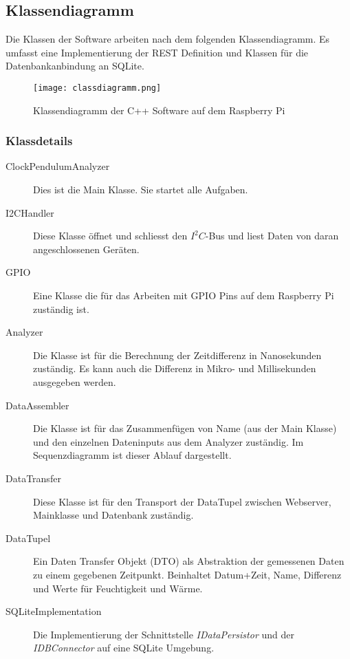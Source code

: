 \subsection{Klassendiagramm}
Die Klassen der Software arbeiten nach dem folgenden Klassendiagramm. Es umfasst eine Implementierung der REST Definition und Klassen für die Datenbankanbindung an SQLite.
\begin{figure}[H]
    \centering
    \texttt{[image: classdiagramm.png]}
    \caption{Klassendiagramm der C++ Software auf dem Raspberry Pi}
\end{figure}
\subsubsection{Klassdetails}
	\begin{description}
        \item[ClockPendulumAnalyzer] Dies ist die Main Klasse. Sie startet alle Aufgaben.
        \item[I2CHandler] Diese Klasse öffnet und schliesst den $I^2C$-Bus und liest Daten von daran angeschlossenen Geräten.
        \item[GPIO] Eine Klasse die für das Arbeiten mit GPIO Pins auf dem Raspberry Pi zuständig ist.
        \item[Analyzer] Die Klasse ist für die Berechnung der Zeitdifferenz in Nanosekunden zuständig. Es kann auch die Differenz in Mikro- und Millisekunden ausgegeben werden.
        \item[DataAssembler] Die Klasse ist für das Zusammenfügen von Name (aus der Main Klasse) und den einzelnen Dateninputs aus dem Analyzer zuständig. Im Sequenzdiagramm ist dieser Ablauf dargestellt. %
        \item[DataTransfer] Diese Klasse ist für den Transport der DataTupel zwischen Webserver, Mainklasse und Datenbank zuständig.
        \item[DataTupel] Ein Daten Transfer Objekt (DTO) als Abstraktion der gemessenen Daten zu einem gegebenen Zeitpunkt. Beinhaltet Datum+Zeit, Name, Differenz und Werte für Feuchtigkeit und Wärme.
        \item[SQLiteImplementation] Die Implementierung der Schnittstelle \textit{IDataPersistor} und der \textit{IDBConnector} auf eine SQLite Umgebung.
    \end{description}